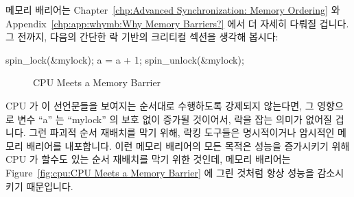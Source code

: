 메모리 배리어는
Chapter~\ref{chp:Advanced Synchronization: Memory Ordering} 와
Appendix~\ref{chp:app:whymb:Why Memory Barriers?}
에서 더 자세히 다뤄질 겁니다.
그 전까지, 다음의 간단한 락 기반의 크리티컬 섹션을 생각해 봅시다:

\begin{VerbatimN}
spin_lock(&mylock);
a = a + 1;
spin_unlock(&mylock);
\end{VerbatimN}

\begin{figure}[tb]
\centering
{}
\caption{CPU Meets a Memory Barrier}
\end{figure}

CPU 가 이 선언문들을 보여지는 순서대로 수행하도록 강제되지 않는다면, 그
영향으로 변수 ``a'' 는 ``mylock'' 의 보호 없이 증가될 것이어서, 락을 잡는
의미가 없어질 겁니다.
그런 파괴적 순서 재배치를 막기 위해, 락킹 도구들은 명시적이거나 암시적인 메모리
배리어를 내포합니다.
이런 메모리 배리어의 모든 목적은 성능을 증가시키기 위해 CPU 가 할수도 있는 순서
재배치를 막기 위한 것인데, 메모리 배리어는
Figure~\ref{fig:cpu:CPU Meets a Memory Barrier}
에 그린 것처럼 항상 성능을 감소시키기 때문입니다.

